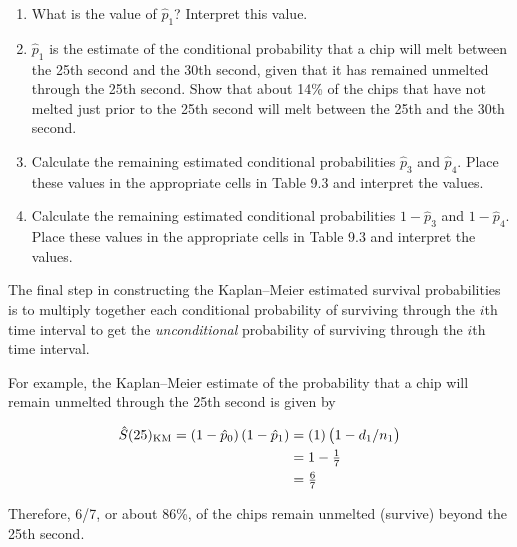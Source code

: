 \documentclass[
]{book}
\providecommand{\tightlist}{%
  \setlength{\itemsep}{0pt}\setlength{\parskip}{0pt}}
\begin{document}
\begin{enumerate}
\def\labelenumi{\arabic{enumi}.}
\setcounter{enumi}{8}
\tightlist
\item
  What is the value of \(\hat p_1\)? Interpret this value.\\
\item
  \(\hat p_1\) is the estimate of the conditional probability that a chip will melt between the 25th second and the 30th second, given that it has remained unmelted through the 25th second. Show that about 14\% of the chips that have not melted just prior to the 25th second will melt between the 25th and the 30th second.\\
\item
  Calculate the remaining estimated conditional probabilities \(\hat p_3\) and \(\hat p_4\). Place these values in the appropriate cells in Table 9.3 and interpret the values.\\
\item
  Calculate the remaining estimated conditional probabilities \(1 - \hat p_3\) and \(1 - \hat p_4\). Place these values in the appropriate cells in Table 9.3 and interpret the values.
\end{enumerate}

The final step in constructing the Kaplan--Meier estimated survival probabilities is to multiply together each conditional probability of surviving through the \(i\)th time interval to get the \emph{unconditional} probability of surviving through the \(i\)th time interval.

For example, the Kaplan--Meier estimate of the probability that a chip will remain unmelted through the 25th second is given by

\begin{align}
\hat S(25)_{\mathrm{KM}} = (1 - \hat p_0)\,(1 - \hat p_1) &= (1)\,\bigl(1 - d_1/n_1\bigr) \notag \\
&= 1 - \tfrac{1}{7} \notag \\ 
&= \tfrac{6}{7} \notag
\end{align}

Therefore, 6/7, or about 86\%, of the chips remain unmelted (survive) beyond the 25th second.
\end{document}
